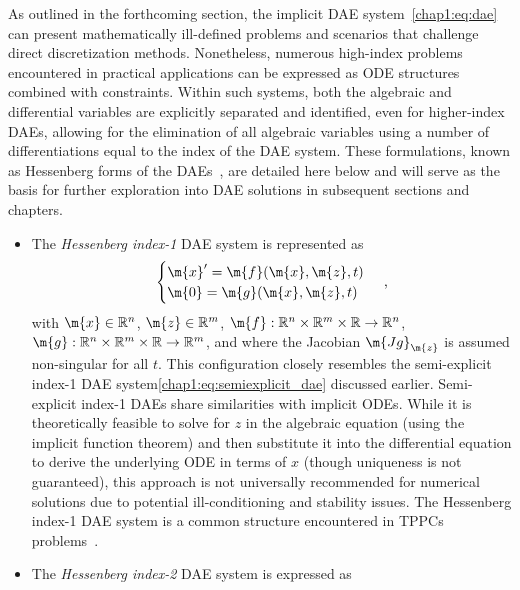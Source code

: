 As outlined in the forthcoming section, the implicit \ac{DAE} system~\eqref{chap1:eq:dae} can present mathematically ill-defined problems and scenarios that challenge direct discretization methods. Nonetheless, numerous high-index problems encountered in practical applications can be expressed as \ac{ODE} structures combined with constraints. Within such systems, both the algebraic and differential variables are explicitly separated and identified, even for higher-index \acp{DAE}, allowing for the elimination of all algebraic variables using a number of differentiations equal to the index of the \ac{DAE} system. These formulations, known as Hessenberg forms of the \acp{DAE}~\cite{brenan1995numerical}, are detailed here below and will serve as the basis for further exploration into \ac{DAE} solutions in subsequent sections and chapters.
%
\begin{itemize}
  \setlength\itemsep{0.0em}
  \item The \emph{Hessenberg index-1} \ac{DAE} system is represented as
  \begin{equation*}
    \begin{cases}
      \m{x}^{\prime} = \m{f}(\m{x}, \m{z}, t) \\
      \m{0} = \m{g}(\m{x}, \m{z}, t)
    \end{cases} \, \text{,}
  \end{equation*}
  with $\m{x} \in \mathbb{R}^n$, $\m{z} \in \mathbb{R}^m$, $\m{f}: \mathbb{R}^{n} \times \mathbb{R}^{m} \times \mathbb{R} \rightarrow \mathbb{R}^{n}$, $\m{g}: \mathbb{R}^{n} \times \mathbb{R}^{m} \times \mathbb{R} \rightarrow \mathbb{R}^{m}$, and where the Jacobian $\m{Jg}_\m{z}$ is assumed non-singular for all $t$. This configuration closely resembles the semi-explicit index-1 \ac{DAE} system\eqref{chap1:eq:semiexplicit_dae} discussed earlier. Semi-explicit index-1 \acp{DAE} share similarities with implicit \acp{ODE}. While it is theoretically feasible to solve for $z$ in the algebraic equation (using the implicit function theorem) and then substitute it into the differential equation to derive the underlying \ac{ODE} in terms of $x$ (though uniqueness is not guaranteed), this approach is not universally recommended for numerical solutions due to potential ill-conditioning and stability issues. The Hessenberg index-1 \ac{DAE} system is a common structure encountered in \acp{TPPC} problems~\cite{brenan1995numerical}.
  \item The \emph{Hessenberg index-2} \ac{DAE} system is expressed as
  \begin{equation*}

\end{equation*}
\end{itemize}
